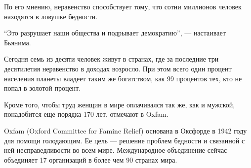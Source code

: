 По его мнению, неравенство способствует тому, что сотни миллионов человек находятся в ловушке бедности.

``Это разрушает наши общества и подрывает демократию'', --- настаивает Бьянима.

Сегодня семь из десяти человек живут в странах, где за последние три десятилетия неравенство в доходах возросло. При этом всего один процент населения планеты владеет таким же богатством, как 99 процентов тех, кто не попал в золотой процент.

Кроме того, чтобы труд женщин в мире оплачивался так же, как и мужской, понадобится еще порядка 170 лет, отмечают в Oxfam.

Oxfam (Oxford Committee for Famine Relief) основана в Оксфорде в 1942 году для помощи голодающим. Ее цель --- решение проблем бедности и связанной с ней несправедливости во всем мире. Международное объединение сейчас объединяет 17 организаций в более чем 90 странах мира.


